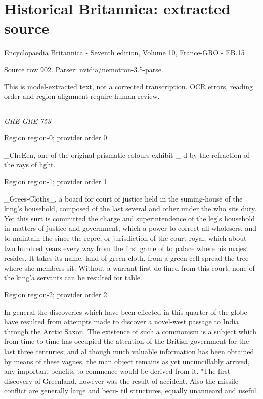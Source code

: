 \documentclass[11pt]{article}
\begin{document}
\section*{Historical Britannica: extracted source}
Encyclopaedia Britannica - Seventh edition, Volume 10, France-GRO - EB.15\par
{\small Source row 902. Parser: nvidia/nemotron-3.5-parse.\par}
{\small This is model-extracted text, not a corrected transcription. OCR errors, reading order and region alignment require human review.\par}
\hrule\medskip
{\small\itshape GRE GRE 753\par}

{\scriptsize\color{gray} Region region-0; provider order 0.\par}
\medskip

\_CheEen, one of the original prismatic colours exhibit-\_
d by the refraction of the rays of light.
\par

{\scriptsize\color{gray} Region region-1; provider order 1.\par}
\medskip

\_Grees-Cloths\_, a board for court of justice held in the
suming-house of the king’s household, composed of the
last several and other under the who sits duty. Yet this
surt is committed the charge and superintendence of the
leg’s household in matters of justice and government,
which a power to correct all wholesers, and to maintain the
since the repre, or jurisdiction of the court-royal, which
about two hundred years every way from the first game of
to palace where his majest resides. It takes its name,
land of green cloth, from a green cell spread the tree
where she members sit. Without a warrant first do
fined from this court, none of the king’a servants can be
resulted for table.
\par

{\scriptsize\color{gray} Region region-2; provider order 2.\par}
\medskip

In general the discoveries which have been effected in
this quarter of the globe have resulted from attempts made
to discover a novel-west passage to India through the Arctic
Saxon. The existence of such a commonism is a subject
which from time to time has occupied the attention of the
British government for the last three centuries; and al
though much valuable information has been obtained by
means of these vagues, the man object remains as yet uncuncillably
arrived, any important benefits to commence would be derived from
it. "The first discovery of Greenland, however was the result
of accident. Also the missile conflict are generally large and becu-
til structures, equally unanneard and useful.
\par
\end{document}

